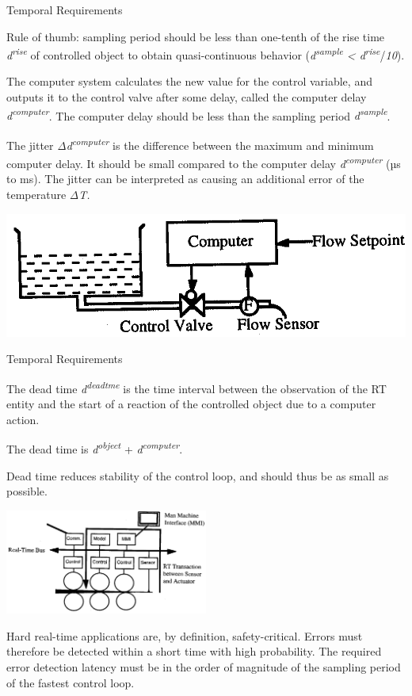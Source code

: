 \begin{frame}{Temporal Requirements}

Rule of thumb: sampling period should be less than one-tenth of the rise
time \emph{d\textsuperscript{rise}} of controlled object to obtain
quasi-continuous behavior (\emph{d\textsuperscript{sample} \textless{}
d\textsuperscript{rise}}/\emph{10}).

The computer system calculates the new value for the control variable,
and outputs it to the control valve after some delay, called the
computer delay \emph{d\textsuperscript{computer}}. The computer delay
should be less than the sampling period
\emph{d\textsuperscript{sample}}.

The jitter \emph{Δd\textsuperscript{computer}} is the difference between
the maximum and minimum computer delay. It should be small compared to
the computer delay \emph{d\textsuperscript{computer}} (µs to ms). The
jitter can be interpreted as causing an additional error of the
temperature \emph{ΔT.}

\includegraphics[width=\textwidth]{media/Fig_1_8.png}
\end{frame}

\begin{frame}{Temporal Requirements}


The dead time \emph{d\textsuperscript{deadtme }}is the time interval
between the observation of the RT entity and the start of a reaction of
the controlled object due to a computer action.

The dead time is \emph{d\textsuperscript{object}} +
\emph{d\textsuperscript{computer}}.

Dead time reduces stability of the control loop, and should thus be as
small as possible.

\includegraphics[width=0.5\textwidth]{media/Fig_1_9.png}

Hard real-time applications are, by definition, safety-critical. Errors
must therefore be detected within a short time with high probability.
The required error detection latency must be in the order of magnitude
of the sampling period of the fastest control loop.

\end{frame}

